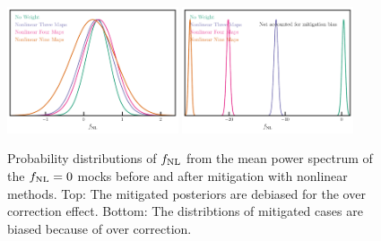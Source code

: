 

\begin{figure}
\centering
\includegraphics[width=0.45\textwidth]{figures/mcmc_cont.pdf}
\includegraphics[width=0.45\textwidth]{figures/mcmc_contnoshift.pdf}
\caption{Probability distributions of $f_{\rm NL}$ from the mean power spectrum of the $f_{\rm NL}=0$ mocks before and after mitigation with nonlinear methods. Top: The mitigated posteriors are debiased for the over correction effect. Bottom: The distribtions of mitigated cases are biased because of over correction.}\label{fig:contmcmc}
\end{figure}




